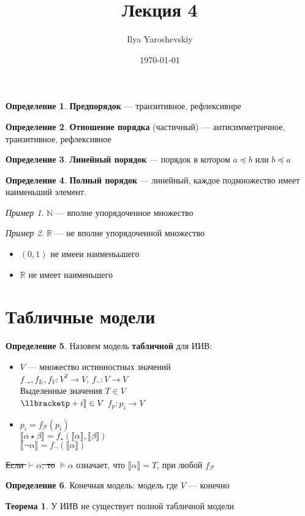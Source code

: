 \documentclass[english]{article}
\author{Ilya Yaroshevskiy}
\date{\today}
\title{Лекция 4}
\newcommand{\R}{\mathbb{R}}
\newcommand{\N}{\mathbb{N}}
\theoremstyle{plain}
\theoremstyle{remark}
\newtheorem*{examp}{Пример}
\theoremstyle{definition}
\newtheorem{theorem}{Теорема}[section]
\newtheorem*{definition}{Определение}
\begin{document}
\maketitle
\tableofcontents

\renewcommand{\P}{\mathcal{P}}
\newcommand{\A}{\mathcal{A}}
\newcommand{\L}{\mathcal{L}}
\newcommand{\B}{\mathcal{B}}


\begin{definition}
\textbf{Предпорядок} --- транзитивное, рефлексивнре
\end{definition}
\begin{definition}
\textbf{Отношение порядка} (частичный) --- антисимметричное, транзитивное, рефлексивное
\end{definition}
\begin{definition}
\textbf{Линейный порядок} --- порядок в котором \(a \preceq b\) или \(b \preceq a\)
\end{definition}
\begin{definition}
\textbf{Полный порядок} --- линейный, каждое подмножество имеет наименьший элемент. 
\end{definition}
\begin{examp}
\(\N\) --- вполне упорядоченное множество
\end{examp}
\begin{examp}
\(\R\) --- не вполне упорядоченной множество
\begin{itemize}
\item \((0, 1)\) не имееи наименььшего
\item \(\R\) не имеет наименьшего
\end{itemize}
\end{examp}
\section{Табличные модели}
\label{sec:orga719833}
\begin{definition}
Назовем модель \textbf{табличной} для ИИВ:
\begin{itemize}
\item \(V\) --- множество истинностных значений \\
\(f_\to,f_\&, f_V: V^2 \to V\), \(f_\neg: V \to V\) \\
Выделенные значения \(T \in V\) \\
\(\llbracketp+i\rrbracket \in V\) \(f_p : p_i \to V\)
\item \(p_i = f_\P(p_i)\) \\
\(\llbracket\alpha \star \beta\rrbracket = f_\star(\llbracket\alpha\rrbracket, \llbracket\beta\rrbracket)\) \\
\(\llbracket\neg \alpha\rrbracket = f_\neg(\llbracket\alpha\rrbracket)\)
\end{itemize}
\sout{Если \(\vdash \alpha\), то} \(\vDash \alpha\) означает, что \(\llbracket\alpha\rrbracket = T\), при любой \(f_\P\)
\end{definition}
\begin{definition}
Конечная модель: модель где \(V\) --- конечно
\end{definition}
\begin{theorem}
У ИИВ не существует полной табличной модели
\end{theorem}
\end{document}
